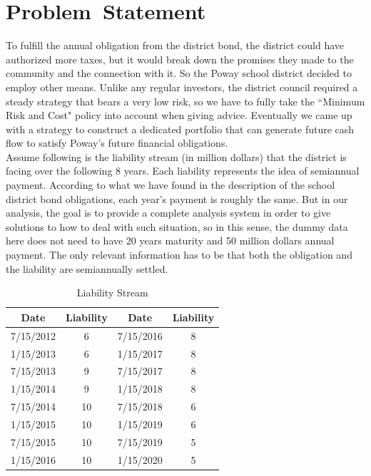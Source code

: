 \documentclass[oneside,12pt]{report}
\begin{document}
{\chapter{Problem~Statement}\label{}
%
To fulfill the annual obligation from the district bond, the district could have authorized more taxes, but it would break down the promises they made to the community and the connection with it. So the Poway school district decided to employ other means. Unlike any regular investors, the district council required a steady strategy that bears a very low risk, so we have to fully take the ``Minimum Risk and Cost" policy into account when giving advice. Eventually we came up with a strategy to construct a dedicated portfolio that can generate future cash flow to satisfy Poway's future financial obligations. \\

\noindent Assume following is the liability stream (in million dollars) that the district is facing over the following 8 years. Each liability represents the idea of semiannual payment. According to what we have found in the description of the school district bond obligations, each year's payment is roughly the same. But in our analysis, the goal is to provide a complete analysis system in order to give solutions to how to deal with such situation, so in this sense, the dummy data here does not need to have 20 years maturity and 50 million dollars annual payment. The only relevant information has to be that both the obligation and the liability are semiannually settled. 
\vspace{3mm}
\begin{table}[h]
\centering  
\begin{tabular}{|c|c|c|c|}
\hline
Date  &Liability  &Date  &Liability\\ \hline  
7/15/2012  &6  &7/15/2016  &8\\
1/15/2013  &6  &1/15/2017  &8\\ 
7/15/2013  &9  &7/15/2017  &8\\ 
1/15/2014  &9  &1/15/2018  &8\\ 
7/15/2014  &10 &7/15/2018  &6\\ 
1/15/2015  &10  &1/15/2019  &6\\ 
7/15/2015  &10  &7/15/2019  &5 \\ 
1/15/2016  &10  &1/15/2020  &5\\ \hline
\end{tabular}
\caption{Liability Stream}
\label{Table 1}
\end{table}

}
\end{document}
